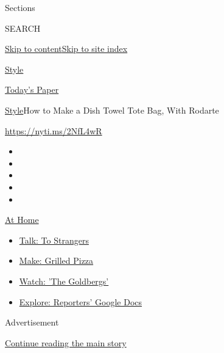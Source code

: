 Sections

SEARCH

\protect\hyperlink{site-content}{Skip to
content}\protect\hyperlink{site-index}{Skip to site index}

\href{https://www.nytimes.com/section/style}{Style}

\href{https://myaccount.nytimes.com/auth/login?response_type=cookie\&client_id=vi}{}

\href{https://www.nytimes.com/section/todayspaper}{Today's Paper}

\href{/section/style}{Style}\textbar{}How to Make a Dish Towel Tote Bag,
With Rodarte

\url{https://nyti.ms/2NfL4wR}

\begin{itemize}
\item
\item
\item
\item
\item
\end{itemize}

\href{https://www.nytimes.com/spotlight/at-home?action=click\&pgtype=Article\&state=default\&region=TOP_BANNER\&context=at_home_menu}{At
Home}

\begin{itemize}
\tightlist
\item
  \href{https://www.nytimes.com/2020/08/03/well/family/the-benefits-of-talking-to-strangers.html?action=click\&pgtype=Article\&state=default\&region=TOP_BANNER\&context=at_home_menu}{Talk:
  To Strangers}
\item
  \href{https://www.nytimes.com/2020/08/01/at-home/coronavirus-make-pizza-on-a-grill.html?action=click\&pgtype=Article\&state=default\&region=TOP_BANNER\&context=at_home_menu}{Make:
  Grilled Pizza}
\item
  \href{https://www.nytimes.com/2020/07/31/arts/television/goldbergs-abc-stream.html?action=click\&pgtype=Article\&state=default\&region=TOP_BANNER\&context=at_home_menu}{Watch:
  'The Goldbergs'}
\item
  \href{https://www.nytimes.com/interactive/2020/at-home/even-more-reporters-editors-diaries-lists-recommendations.html?action=click\&pgtype=Article\&state=default\&region=TOP_BANNER\&context=at_home_menu}{Explore:
  Reporters' Google Docs}
\end{itemize}

Advertisement

\protect\hyperlink{after-top}{Continue reading the main story}

